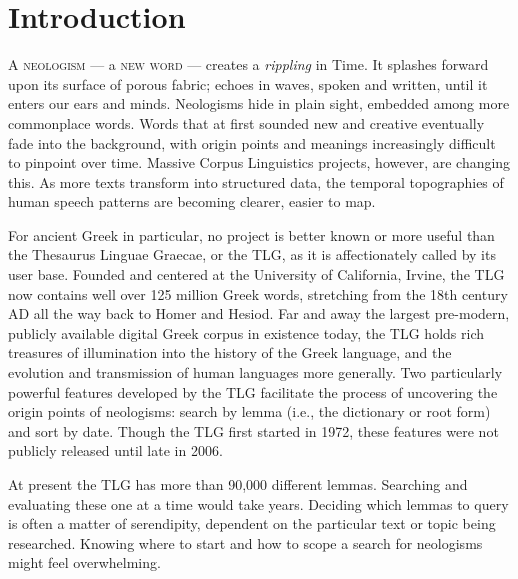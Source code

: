 %
%
\null%
\thispagestyle{empty}%
\clearpage%
%
\chapter{Introduction}%
%
\vspace*{5mm}
%
\justifying

\noindent A \textsc{neologism} --- a \textsc{new word} --- creates a \textit{rippling} in Time. %
It splashes forward upon its surface of porous fabric; %
echoes in waves, spoken and written, until it enters our ears and minds. %
Neologisms hide in plain sight, %
embedded among more commonplace words. %
Words that at first sounded new and creative eventually fade into the background, %
with origin points and meanings increasingly difficult to pinpoint over time. %
Massive Corpus Linguistics projects, however, are changing this. %
As more texts transform into structured data, %
the temporal topographies of human speech patterns are becoming clearer, easier to map. 
%

For ancient Greek in particular, no project is better known %
or more useful than the Thesaurus Linguae Graecae, or the TLG, %
as it is affectionately called by its user base. %
Founded and centered at the University of California, Irvine, %
the TLG now contains well over 125 million Greek words, %
stretching from the 18th century AD all the way back to Homer and Hesiod. %
Far and away the largest pre-modern, %
publicly available digital Greek corpus in existence today, %
the TLG holds rich treasures of illumination into the history of the Greek language, %
and the evolution and transmission of human languages more generally.
Two particularly powerful features developed by the TLG facilitate %
the process of uncovering the origin points of neologisms: %
search by lemma (i.e., the dictionary or root form) and sort by date. %
Though the TLG first started in 1972, %
these features were not publicly released until late in 2006.

At present the TLG has more than 90,000 different lemmas. %
Searching and evaluating these one at a time would take years. %
Deciding which lemmas to query is often a matter of serendipity, %
dependent on the particular text or topic being researched. %
Knowing where to start and how to scope a search for neologisms might feel overwhelming.

